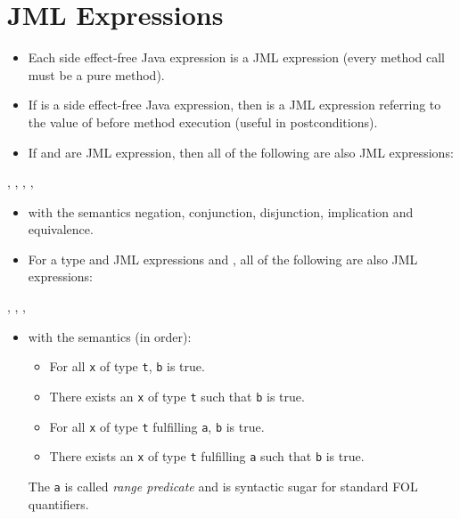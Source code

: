 	\section{JML Expressions}
		\begin{itemize}
			\item Each side effect-free Java expression is a JML expression (every method call must be a pure method).
			\item If  is a side effect-free Java expression, then  is a JML expression referring to the value of  before method execution (useful in postconditions).
			\item If  and  are  JML expression, then all of the following are also  JML expressions:
		\end{itemize}
		\begin{center}
			, \quad {}, \quad {}, \quad {}, \quad {}
		\end{center}
		\begin{itemize}
			\item[] with the semantics negation, conjunction, disjunction, implication and equivalence.
			\item For a type  and  JML expressions  and , all of the following are also  JML expressions:
		\end{itemize}
		\begin{center}
			, \quad {}, \quad {}, \quad {}
		\end{center}
		\begin{itemize}
			\item[] with the semantics (in order):
				\begin{itemize}
					\item For all \texttt{x} of type \texttt{t}, \texttt{b} is true.
					\item There exists an \texttt{x} of type \texttt{t} such that \texttt{b} is true.
					\item For all \texttt{x} of type \texttt{t} fulfilling \texttt{a}, \texttt{b} is true.
					\item There exists an \texttt{x} of type \texttt{t} fulfilling \texttt{a} such that \texttt{b} is true.
				\end{itemize}
				The  \texttt{a} is called \textit{range predicate} and is syntactic sugar for standard FOL quantifiers.
		\end{itemize}
	

